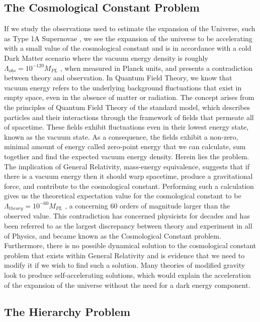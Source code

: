 \documentclass[11pt]{report}
\numberwithin{equation}{chapter}
\begin{document}
\subsection{The Cosmological Constant Problem}
If we study the observations used to estimate the expansion of the Universe, such as Type 1A Supernovae \cite{Perlmutter_1999}, we see the expansion of the universe to be accelerating with a small value of the cosmological constant and is in accordance with a cold Dark Matter scenario where the vacuum energy density is roughly $\Lambda_{obs} = {10}^{-120}M_{PL}$ \cite{Kurts_review}, when measured in Planck units, and presents a contradiction between theory and observation. In Quantum Field Theory, we know that vacuum energy refers to the underlying background fluctuations that exist in empty space, even in the absence of matter or radiation. The concept arises from the principles of Quantum Field Theory of the standard model, which describes particles and their interactions through the framework of fields that permeate all of spacetime. These fields exhibit fluctuations even in their lowest energy state, known as the vacuum state. As a consequence, the fields exhibit a non-zero, minimal amount of energy called zero-point energy that we can calculate, sum together and find the expected vacuum energy density. Herein lies the problem\cite{CCreview}. The implication of General Relativity, mass-energy equivalence, suggests that if there is a vacuum energy then it should warp spacetime, produce a gravitational force, and contribute to the cosmological constant. Performing such a calculation gives us the theoretical expectation value for the cosmological constant to be $\Lambda_{theory}={10}^{-60}M_{PL}$ \cite{RevModPhys.61.1}, a concerning 60 orders of magnitude larger than the observed value. This contradiction has concerned physicists for decades and has been referred to as the largest discrepancy between theory and experiment in all of Physics, and became known as the Cosmological Constant problem. Furthermore, there is no possible dynamical solution to the cosmological constant problem that exists within General Relativity and is evidence that we need to modify it if we wish to find such a solution. Many theories of modified gravity look to produce self-accelerating solutions, which would explain the acceleration of the expansion of the universe without the need for a dark energy component.

\subsection{The Hierarchy Problem}
\end{document}
